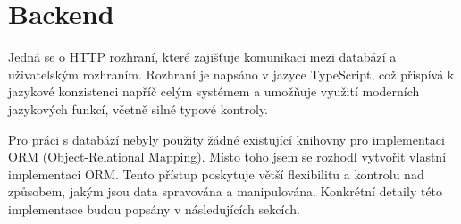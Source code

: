 \section{Backend}
Jedná se o HTTP rozhraní, které zajišťuje komunikaci mezi databází a uživatelským rozhraním. Rozhraní je napsáno v jazyce TypeScript, což přispívá k jazykové konzistenci napříč celým systémem a umožňuje využití moderních jazykových funkcí, včetně silné typové kontroly.

Pro práci s databází nebyly použity žádné existující knihovny pro implementaci ORM (Object-Relational Mapping). Místo toho jsem se rozhodl vytvořit vlastní implementaci ORM. Tento přístup poskytuje větší flexibilitu a kontrolu nad způsobem, jakým jsou data spravována a manipulována. Konkrétní detaily této implementace budou popsány v následujících sekcích.





% 